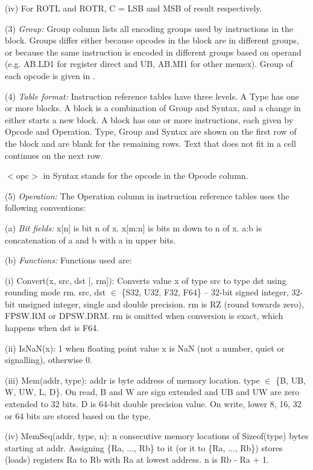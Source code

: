         (iv) For ROTL and ROTR, C = LSB and MSB of result respectively.

\levelone
(3) \emph{Group:} %
Group column lists all encoding groups used by instructions in the block. Groups differ either
because opcodes in the block are in different groups, or because the same instruction is encoded
in different groups based on operand (e.g. AB.LD1 for register direct and UB, AB.MI1 for other
memex). Group of each opcode is given in .

(4) \emph{Table format:} %
Instruction reference tables have three levels. A Type has one or more blocks. A block is a
combination of Group and Syntax, and a change in either starts a new block. A block has one or
more instructions, each given by Opcode and Operation. Type, Group and Syntax are shown on the
first row of the block and are blank for the remaining rows. Text that does not fit in a cell
continues on the next row.

$<$opc$>$ in Syntax stands for the opcode in the Opcode column.

\levelone
(5) \emph{Operation:} %
The Operation column in instruction reference tables uses the following conventions:

    \leveltwo
    (a) \emph{Bit fields:} %
    x[n] is bit n of x. x[m:n] is bits m down to n of x. a:b is concatenation of a and b with 
    a in upper bits. 

    (b) \emph{Functions:} %
    Functions used are:

        \levelthree
        (i) Convert(x, src, dst [, rm]): Converts value x of type src to type dst using rounding 
        mode rm. src, dst $\in$ \{S32, U32, F32, F64\} -- 32-bit signed integer, 32-bit unsigned
        integer, single and double precision. rm is RZ (round towards zero), FPSW.RM or DPSW.DRM.
        rm is omitted when conversion is exact, which happens when dst is F64.

        (ii) IsNaN(x): 1 when floating point value x is NaN (not a number, quiet or signalling), 
        otherwise 0.

        (iii) Mem(addr, type): addr is byte address of memory location. type $\in$ \{B, UB, W, 
        UW, L, D\}. On read, B and W are sign extended and UB and UW are zero extended to 
        32 bits. D is 64-bit double precision value. On write, lower 8, 16, 32 or 64 bits are 
        stored based on the type.

        (iv) MemSeq(addr, type, n): n consecutive memory locations of Sizeof(type) bytes 
        starting at addr. Assigning \{Ra, ..., Rb\} to it (or it to \{Ra, ..., Rb\}) stores 
        (loads) registers Ra to Rb with Ra at lowest address. n is Rb - Ra + 1.

